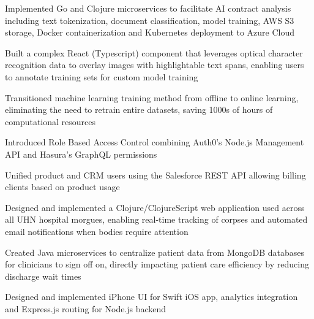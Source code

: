 \documentclass[]{resume}
\begin{document}
\begin{tightemize}
\item Implemented Go and Clojure microservices to facilitate AI contract analysis including text tokenization, document classification, model training, AWS S3 storage, Docker containerization and Kubernetes deployment to Azure Cloud
\item Built a complex React (Typescript) component that leverages optical character recognition data to overlay images with highlightable text spans, enabling users to annotate training sets for custom model training
\item Transitioned machine learning training method from offline to online learning, eliminating the need to retrain entire datasets, saving 1000s of hours of computational resources
\item Introduced Role Based Access Control combining Auth0's Node.js Management API and Hasura's GraphQL permissions
\item Unified product and CRM users using the Salesforce REST API allowing billing clients based on product usage
\end{tightemize}
\separatorL

\begin{tightemize}
\item Designed and implemented a Clojure/ClojureScript web application used across all UHN hospital morgues, enabling real-time tracking of corpses and automated email notifications when bodies require attention
\item Created Java microservices to centralize patient data from MongoDB databases for clinicians to sign off on, directly impacting patient care efficiency by reducing discharge wait times
\end{tightemize}
\separatorL

\begin{tightemize}
\item Designed and implemented iPhone UI for Swift iOS app, analytics integration and Express.js routing for Node.js backend
\end{tightemize}

\end{document}
